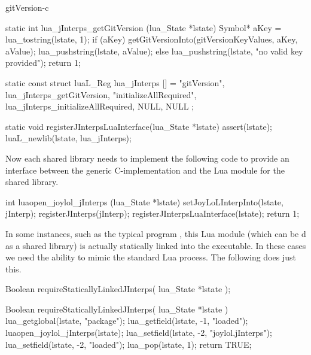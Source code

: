 \component gitVersion-c

\startCCode
static int lua_jInterps_getGitVersion (lua_State *lstate) {
  Symbol* aKey   = lua_tostring(lstate, 1);
  if (aKey) {
    getGitVersionInto(gitVersionKeyValues, aKey, aValue);
    lua_pushstring(lstate, aValue);
  } else {
    lua_pushstring(lstate, "no valid key provided");
  }
  return 1;
}
\stopCCode

\startCCode
static const struct luaL_Reg lua_jInterps [] = {
  {"gitVersion",            lua_jInterps_getGitVersion},
  {"initializeAllRequired", lua_jInterps_initializeAllRequired},
  {NULL, NULL}
};
\stopCCode

\startCCode
static void registerJInterpsLuaInterface(lua_State *lstate) {
  assert(lstate);
  luaL_newlib(lstate, lua_jInterps);
}
\stopCCode

Now each shared library needs to implement the following code to provide 
an interface between the generic C-implementation and the Lua module for 
the shared library. 

\startCCode
int luaopen_joylol_jInterps (lua_State *lstate) {
  setJoyLoLInterpInto(lstate, jInterp);
  registerJInterps(jInterp);
  registerJInterpsLuaInterface(lstate);
  return 1;
}
\stopCCode

In some instances, such as the typical  program 
, this Lua module (which can be d as a 
shared library) is actually statically linked into the executable. In 
these cases we need the ability to mimic the standard Lua  
process. The following  does just this. 

\startCHeader
Boolean requireStaticallyLinkedJInterps(
  lua_State *lstate
);
\stopCHeader

\startCCode
Boolean requireStaticallyLinkedJInterps(
  lua_State *lstate
) {
  lua_getglobal(lstate, "package");
  lua_getfield(lstate, -1, "loaded");
  luaopen_joylol_jInterps(lstate);
  lua_setfield(lstate, -2, "joylol.jInterps");
  lua_setfield(lstate, -2, "loaded");
  lua_pop(lstate, 1);
  return TRUE;
}
\stopCCode
